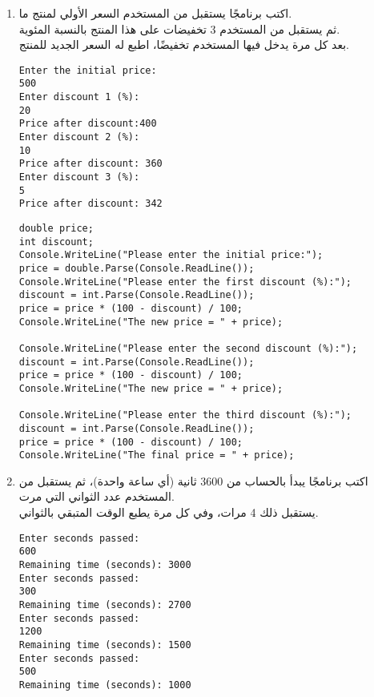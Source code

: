 ﻿\documentclass[12pt]{article}
\begin{document}
\begin{enumerate}
\item
اكتب برنامجًا يستقبل من المستخدم السعر الأولي لمنتج ما. \\
ثم يستقبل من المستخدم 3 تخفيضات على هذا المنتج بالنسبة المئوية. \\
بعد كل مرة يدخل فيها المستخدم تخفيضًا، اطبع له السعر الجديد للمنتج. \\
\ifdetailed
\begin{boxExample}
\begin{english}
\begin{verbatim}
Enter the initial price:
500
Enter discount 1 (%):
20
Price after discount:400
Enter discount 2 (%):
10
Price after discount: 360
Enter discount 3 (%):
5
Price after discount: 342
\end{verbatim}
\end{english}
\end{boxExample}

\ifwithsols
\begin{boxSolution}
\begin{english}
\begin{verbatim}
double price;
int discount;
Console.WriteLine("Please enter the initial price:");
price = double.Parse(Console.ReadLine());
Console.WriteLine("Please enter the first discount (%):");
discount = int.Parse(Console.ReadLine());
price = price * (100 - discount) / 100;
Console.WriteLine("The new price = " + price);

Console.WriteLine("Please enter the second discount (%):");
discount = int.Parse(Console.ReadLine());
price = price * (100 - discount) / 100;
Console.WriteLine("The new price = " + price);

Console.WriteLine("Please enter the third discount (%):");
discount = int.Parse(Console.ReadLine());
price = price * (100 - discount) / 100;
Console.WriteLine("The final price = " + price);
\end{verbatim}
\end{english}
\end{boxSolution}
\fi

\clearpage
\fi

\item
اكتب برنامجًا يبدأ بالحساب من 3600 ثانية (أي ساعة واحدة)، ثم يستقبل من المستخدم عدد الثواني التي مرت. \\
يستقبل ذلك 4 مرات، وفي كل مرة يطبع الوقت المتبقي بالثواني. \\
\ifdetailed
\begin{boxExample}
\begin{english}
\begin{verbatim}
Enter seconds passed:
600
Remaining time (seconds): 3000
Enter seconds passed:
300
Remaining time (seconds): 2700
Enter seconds passed:
1200
Remaining time (seconds): 1500
Enter seconds passed:
500
Remaining time (seconds): 1000
\end{verbatim}
\end{english}
\end{boxExample}


\end{enumerate}
\end{document}

